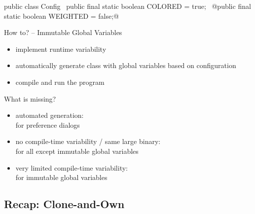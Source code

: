 \begin{frame}[fragile]{\myframetitle}
	\begin{mycolumns}[widths={48}]
\begin{codetight}[basicstyle=\small]{}
public class Config {
	~public final static boolean COLORED = true;~
	@public final static boolean WEIGHTED = false;@
}
\end{codetight}
		\begin{definition}{How to? -- Immutable Global Variables}
			\begin{itemize}
				\item implement runtime variability
				\item automatically generate class with global variables based on configuration
				\item compile and run the program
			\end{itemize}
		\end{definition}
	\mynextcolumn
		\begin{note}{What is missing?}
			\begin{itemize}
				\item automated generation:\\\hfill for preference dialogs
				\item no compile-time variability / same large binary:\\\hfill for all except immutable global variables
				\item very limited compile-time variability:\\\hfill for immutable global variables
			\end{itemize}
		\end{note}
	\end{mycolumns}
\end{frame}

\subsection{Recap: Clone-and-Own}

